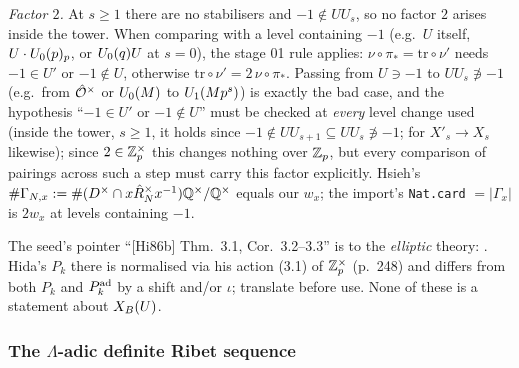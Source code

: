 \noindent\emph{Factor $2$.} At $s\ge1$ there are no stabilisers and $-1\notin UU_s$, so no factor $2$ arises inside the tower.
When comparing with a level containing $-1$ (e.g.\ $U$ itself, $U\cdot U_0(p)_p$, or $U_0(q)U$ at $s=0$), the stage 01 rule
applies: $\nu\circ\pi_*=\mathrm{tr}\circ\nu'$ needs $-1\in U'$ or $-1\notin U$, otherwise $\mathrm{tr}\circ\nu'=2\,\nu\circ\pi_*$.
Passing from $U\ni-1$ to $UU_s\not\ni-1$ (e.g.\ from $\hat{\mathcal{O}}^\times$ or $U_0(M)$ to $U_1(Mp^s)$) is exactly the bad case,
and the hypothesis ``$-1\in U'$ or $-1\notin U$'' must be checked at \emph{every} level change used (inside the tower,
$s\ge1$, it holds since $-1\notin UU_{s+1}\subseteq UU_s\not\ni-1$; for $X'_s\to X_s$ likewise); since $2\in\mathbb{Z}_p^\times$ this changes nothing over $\mathbb{Z}_p$, but every
comparison of pairings across such a step must carry this factor explicitly. Hsieh's $\#\Gamma_{N,x}:=\#(D^\times\cap x\hat R_N^\times x^{-1})\mathbb{Q}^\times/\mathbb{Q}^\times$
equals our $w_x$; the import's \texttt{Nat.card} $=|\Gamma_x|$ is $2w_x$ at levels containing $-1$.

\begin{remark}\label{rem:s04-hida86}
The seed's pointer ``[Hi86b] Thm.~3.1, Cor.~3.2--3.3'' is to the \emph{elliptic} theory:
. Hida's
$P_k$ there is normalised via his action (3.1) of $\mathbb{Z}_p^\times$ (p.~248) and differs from both $P_k$ and $P^{\rm ad}_k$ by a shift
and/or $\iota$; translate before use. None of these is a statement about $X_B(U)$.
\end{remark}

\subsubsection{The $\Lambda$-adic definite Ribet sequence}

